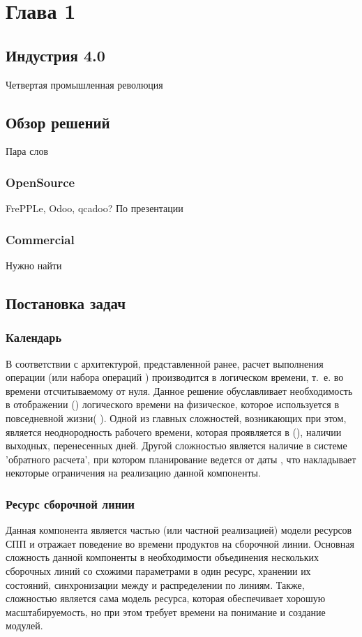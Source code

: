 \chapter{Глава 1}
\section{Индустрия 4.0}
Четвертая промышленная революция


\section{Обзор решений}
Пара слов
\subsection{OpenSource}
FrePPLe, Odoo, qcadoo?
По презентации
\subsection{Commercial}
Нужно найти
\section{Постановка задач}
\subsection{Календарь}
В соответствии с архитектурой, представленной ранее, расчет выполнения операции
(или набора операций ) производится в логическом времени,
т.~е. во времени отсчитываемому от нуля. Данное решение обуславливает необходимость в
отображении () логического времени на физическое, 
которое используется в повседневной жизни( ).
Одной из главных сложностей, возникающих при этом, является неоднородность рабочего 
времени, которая проявляется в (), 
наличии выходных, перенесенных дней. Другой сложностью является наличие в системе 'обратного расчета', при котором планирование ведется от даты , что накладывает некоторые ограничения на реализацию данной компоненты.
\subsection{Ресурс сборочной линии}
Данная компонента является частью (или частной реализацией) модели ресурсов СПП и отражает поведение во времени продуктов на сборочной линии. Основная сложность данной компоненты в необходимости объединения нескольких сборочных линий со схожими параметрами в один ресурс, хранении их состояний, синхронизации между  и распределении  по линиям. Также, сложностью является сама модель ресурса, которая обеспечивает хорошую масштабируемость, но при этом требует времени на понимание и создание модулей.
